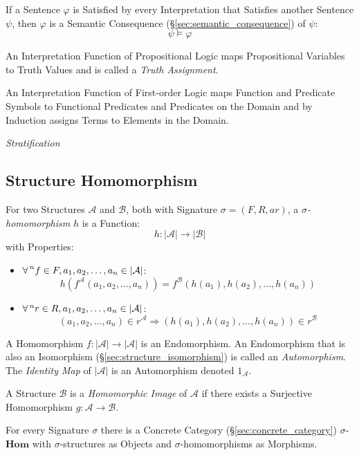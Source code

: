 If a Sentence $\varphi$ is Satisfied by every Interpretation that
Satisfies another Sentence $\psi$, then $\varphi$ is a Semantic
Consequence (\S\ref{sec:semantic_consequence}) of $\psi$:
\[
  \psi \vDash \varphi
\]

An Interpretation Function of Propositional Logic maps Propositional
Variables to Truth Values and is called a \emph{Truth Assignment}.

An Interpretation Function of First-order Logic maps Function and
Predicate Symbols to Functional Predicates and Predicates on the
Domain and by Induction assigns Terms to Elements in the Domain.

\emph{Stratification}



\subsection{Structure Homomorphism}\label{sec:structure_homomorphism}

For two Structures $\mathcal{A}$ and $\mathcal{B}$, both with
Signature $\sigma = (F,R,ar)$, a \emph{$\sigma$-homomorphism} $h$ is a
Function:
\[
  h : |\mathcal{A}| \rightarrow |\mathcal{B}|
\]
with Properties:
\begin{itemize}
  \item $\forall \prescript{n}{}{f} \in F,
    a_1, a_2,\ldots, a_n \in |\mathcal{A}|$:
    \[
      h (f^\mathcal{A}(a_1, a_2,\ldots, a_n))
      = f^\mathcal{B} (h(a_1), h(a_2),\ldots, h(a_n))
    \]
  \item $\forall \prescript{n}{}{r} \in R,
    a_1, a_2,\ldots, a_n \in |\mathcal{A}|$:
    \[
      (a_1,a_2,\ldots,a_n) \in r^\mathcal{A} \Rightarrow
      (h(a_1), h(a_2),\ldots,h(a_n)) \in r^\mathcal{B}
    \]
\end{itemize}
A Homomorphism $f : |\mathcal{A}| \rightarrow |\mathcal{A}|$ is an
Endomorphism. An Endomorphism that is also an Isomorphism
(\S\ref{sec:structure_isomorphism}) is called an \emph{Automorphism}.
The \emph{Identity Map} of $|\mathcal{A}|$ is an Automorphism denoted
$1_\mathcal{A}$.

A Structure $\mathcal{B}$ is a \emph{Homomorphic Image} of
$\mathcal{A}$ if there exists a Surjective Homomorphism $g :
\mathcal{A} \rightarrow \mathcal{B}$.

For every Signature $\sigma$ there is a Concrete Category
(\S\ref{sec:concrete_category}) $\sigma$-$\mathbf{Hom}$ with
$\sigma$-structures as Objects and $\sigma$-homomorphisms as
Morphisms.



